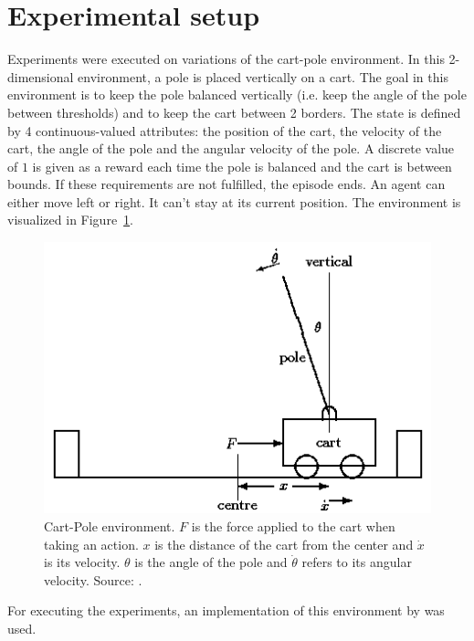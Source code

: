 \section{Experimental setup}
Experiments were executed on variations of the cart-pole environment.
In this 2-dimensional environment, a pole is placed vertically on a cart. The goal in this environment is to keep the pole balanced vertically (i.e. keep the angle of the pole between thresholds) and to keep the cart between 2 borders.
The state is defined by 4 continuous-valued attributes: the position of the cart, the velocity of the cart, the angle of the pole and the angular velocity of the pole. A discrete value of $1$ is given as a reward each time the pole is balanced and the cart is between bounds. If these requirements are not fulfilled, the episode ends. An agent can either move left or right. It can't stay at its current position. The environment is visualized in Figure~\ref{fig:cartpole}.
\begin{figure}[htb]
    \centering
    \includegraphics[width=.6\linewidth]{images/cartpole.png}
    \caption[Cart-Pole environment]{Cart-Pole environment. $F$ is the force applied to the cart when taking an action. $x$ is the distance of the cart from the center and $\dot{x}$ is its velocity. $\theta$ is the angle of the pole and $\dot{\theta}$ refers to its angular velocity. Source: \cite{grant1990modelling}.}
    \label{fig:cartpole}
\end{figure}
For executing the experiments, an implementation of this environment by \cite{Brockman2016OpenAIGym} was used.\\

